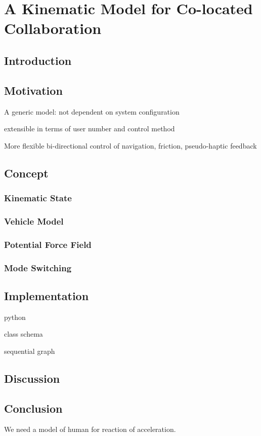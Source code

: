 \chapter{A Kinematic Model for Co-located Collaboration}
\label{chapter:kinematic_model}
\minitoc

\section{Introduction}



\section{Motivation}
A generic model: not dependent on system configuration
 
extensible in terms of user number and control method

More flexible bi-directional control of navigation, friction, pseudo-haptic feedback


\section{Concept}
\subsection{Kinematic State}
\subsection{Vehicle Model}
\subsection{Potential Force Field}
\subsection{Mode Switching}

\section{Implementation}

python

class schema

sequential graph

\section{Discussion}

\section{Conclusion}
We need a model of human for reaction of acceleration.